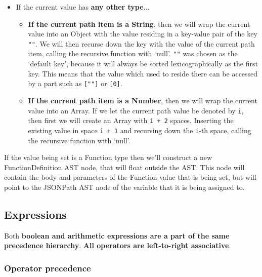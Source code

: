 \begin{center}
\begin{itemize}
\begin{itemize}
\begin{itemize}
\begin{itemize}
                \end{itemize}
            \end{itemize}
            \item If the current value has \textbf{any other type}...
            \begin{itemize}
                \item \textbf{If the current path item is a String}, then we will wrap the current value into an Object with the value residing in a key-value pair of the key \verb|""|. We will then recurse down the key with the value of the current path item, calling the recursive function with `null'. \verb|""| was chosen as the `default key', because it will always be sorted lexicographically as the first key. This means that the value which used to reside there can be accessed by a part such as \verb|[""]| or \verb|[0]|.
                \item \textbf{If the current path item is a Number}, then we will wrap the current value into an Array. If we let the current path value be denoted by \verb|i|, then first we will create an Array with \verb|i + 2| spaces. Inserting the existing value in space \verb|i + 1| and recursing down the \verb|i|-th space, calling the recursive function with `null'.
            \end{itemize}
        \end{itemize}
    \end{itemize}
\end{center}

If the value being set is a Function type then we'll construct a new FunctionDefinition AST node, that will float outside the AST. This node will contain the body and parameters of the Function value that is being set, but will point to the JSONPath AST node of the variable that it is being assigned to.

\subsection{Expressions}
\label{sec:expressions}

Both \textbf{boolean and arithmetic expressions are a part of the same precedence hierarchy}. \textbf{All operators are left-to-right associative}.

\subsubsection{Operator precedence}

